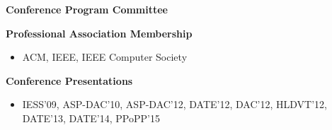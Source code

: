 \textbf{\large Conference Program Committee} \\
\vspace{-2mm}
\begin{itemize}
\end{itemize}

\textbf{\large Professional Association Membership}\\
\vspace{-2mm}
\begin{itemize}
\item ACM, IEEE, IEEE Computer Society 
\end{itemize}

\textbf{\large Conference Presentations}\\
\vspace{-2mm}
\begin{itemize}
\item IESS'09, ASP-DAC'10, ASP-DAC'12, DATE'12, DAC'12, HLDVT'12, DATE'13, DATE'14, PPoPP'15
\end{itemize}

